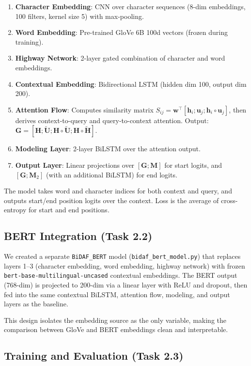\documentclass[10pt,a4paper]{article}
\begin{document}
\begin{enumerate}
    \item \textbf{Character Embedding}: CNN over character sequences (8-dim embeddings, 100 filters, kernel size 5) with max-pooling.
    \item \textbf{Word Embedding}: Pre-trained GloVe 6B 100d vectors (frozen during training).
    \item \textbf{Highway Network}: 2-layer gated combination of character and word embeddings.
    \item \textbf{Contextual Embedding}: Bidirectional LSTM (hidden dim 100, output dim 200).
    \item \textbf{Attention Flow}: Computes similarity matrix $S_{ij} = \mathbf{w}^\top[\mathbf{h}_i; \mathbf{u}_j; \mathbf{h}_i \circ \mathbf{u}_j]$, then derives context-to-query and query-to-context attention. Output: $\mathbf{G} = [\mathbf{H}; \tilde{\mathbf{U}}; \mathbf{H} \circ \tilde{\mathbf{U}}; \mathbf{H} \circ \tilde{\mathbf{H}}]$.
    \item \textbf{Modeling Layer}: 2-layer BiLSTM over the attention output.
    \item \textbf{Output Layer}: Linear projections over $[\mathbf{G}; \mathbf{M}]$ for start logits, and $[\mathbf{G}; \mathbf{M}_2]$ (with an additional BiLSTM) for end logits.
\end{enumerate}

The model takes word and character indices for both context and query, and outputs start/end position logits over the context. Loss is the average of cross-entropy for start and end positions.

\subsection{BERT Integration (Task 2.2)}

We created a separate \texttt{BiDAF\_BERT} model (\texttt{bidaf\_bert\_model.py}) that replaces layers 1--3 (character embedding, word embedding, highway network) with frozen \texttt{bert-base-multilingual-uncased} contextual embeddings. The BERT output (768-dim) is projected to 200-dim via a linear layer with ReLU and dropout, then fed into the same contextual BiLSTM, attention flow, modeling, and output layers as the baseline.

This design isolates the embedding source as the only variable, making the comparison between GloVe and BERT embeddings clean and interpretable.

\subsection{Training and Evaluation (Task 2.3)}
\end{document}
